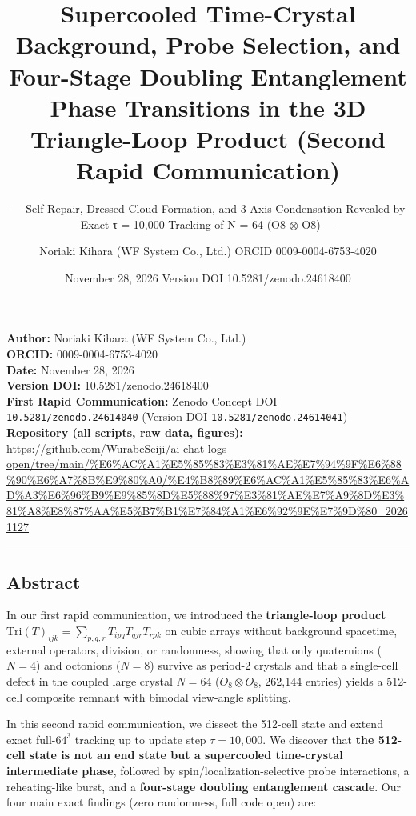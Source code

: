 \documentclass[
  a4paper,
]{article}
\title{Supercooled Time-Crystal Background, Probe Selection, and
Four-Stage Doubling Entanglement Phase Transitions in the 3D
Triangle-Loop Product (Second Rapid Communication)}
\subtitle{― Self-Repair, Dressed-Cloud Formation, and 3-Axis
Condensation Revealed by Exact τ = 10,000 Tracking of N = 64 (O8 $\otimes$ O8)
―}
\author{Noriaki Kihara (WF System Co., Ltd.) ORCID 0009-0004-6753-4020}
\date{November 28, 2026 Version DOI 10.5281/zenodo.24618400}
\begin{document}
\maketitle

\textbf{Author:} Noriaki Kihara (WF System Co., Ltd.)\\
\textbf{ORCID:} 0009-0004-6753-4020\\
\textbf{Date:} November 28, 2026\\
\textbf{Version DOI:} 10.5281/zenodo.24618400\\
\textbf{First Rapid Communication:} Zenodo Concept DOI
\texttt{10.5281/\allowbreak{}zenodo.24614040} (Version DOI
\texttt{10.5281/\allowbreak{}zenodo.24614041})\\
\textbf{Repository (all scripts, raw data, figures):}
\url{https://github.com/WurabeSeiji/ai-chat-logs-open/tree/main/\%E6\%AC\%A1\%E5\%85\%83\%E3\%81\%AE\%E7\%94\%9F\%E6\%88\%90\%E6\%A7\%8B\%E9\%80\%A0/\%E4\%B8\%89\%E6\%AC\%A1\%E5\%85\%83\%E6\%AD\%A3\%E6\%96\%B9\%E9\%85\%8D\%E5\%88\%97\%E3\%81\%AE\%E7\%A9\%8D\%E3\%81\%A8\%E8\%87\%AA\%E5\%B7\%B1\%E7\%84\%A1\%E6\%92\%9E\%E7\%9D\%80\_20261127}

\begin{center}\rule{0.5\linewidth}{0.5pt}\end{center}

\subsection{Abstract}\label{abstract}

In our first rapid communication, we introduced the
\textbf{triangle-loop product}
\(\mathrm{Tri}(T)_{ijk} = \sum_{p,q,r} T_{ipq} T_{qjr} T_{rpk}\) on
cubic arrays without background spacetime, external operators, division,
or randomness, showing that only quaternions (\(N=4\)) and octonions
(\(N=8\)) survive as period-2 crystals and that a single-cell defect in
the coupled large crystal \(N=64\) (\(O_8 \otimes O_8\), 262,144
entries) yields a 512-cell composite remnant with bimodal view-angle
splitting.

In this second rapid communication, we dissect the 512-cell state and
extend exact full-\(64^3\) tracking up to update step \(\tau = 10,000\).
We discover that \textbf{the 512-cell state is not an end state but a
supercooled time-crystal intermediate phase}, followed by
spin/localization-selective probe interactions, a reheating-like burst,
and a \textbf{four-stage doubling entanglement cascade}. Our four main
exact findings (zero randomness, full code open) are:
\end{document}
